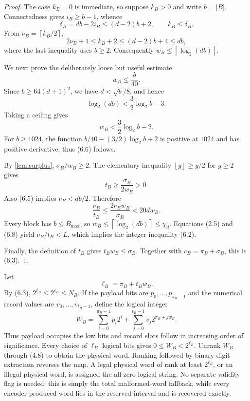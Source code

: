 \documentclass[11pt]{article}
\theoremstyle{definition}
\theoremstyle{remark}
\newcommand{\ceil}[1]{\left\lceil #1\right\rceil}
\newcommand{\floor}[1]{\left\lfloor #1\right\rfloor}
\begin{document}
\begin{proof}
The case $k_B=0$ is immediate, so suppose $k_B>0$ and write $b=|B|$.
Connectedness gives $i_B\ge b-1$, whence
\[
 \delta_B=db-2i_B\le(d-2)b+2,
 \qquad k_B\le\delta_B.                                      \tag{6.4}
\]
From $\nu_B=\ceil{k_B/2}$,
\[
 2\nu_B+1\le k_B+2\le(d-2)b+4\le db,                         \tag{6.5}
\]
where the last inequality uses $b\ge2$.  Consequently
$w_B\le\ceil{\log_2(db)}$.

We next prove the deliberately loose but useful estimate
\[
                              w_B\le\frac b{40}.                \tag{6.6}
\]
Since $b\ge64(d+1)^2$, we have $d<\sqrt b/8$, and hence
\[
 \log_2(db)<\frac32\log_2b-3.
\]
Taking a ceiling gives
\[
 w_B<\frac32\log_2b-2.
\]
For $b\ge1024$, the function
$b/40-(3/2)\log_2b+2$ is positive at $1024$ and has positive derivative;
thus (6.6) follows.

By \cref{lem:surplus}, $\sigma_B/w_B\ge2$.  The elementary inequality
$\floor y\ge y/2$ for $y\ge2$ gives
\[
                         t_B\ge\frac{\sigma_B}{2w_B}>0.        \tag{6.7}
\]
Also (6.5) implies $\nu_B<db/2$.  Therefore
\[
 \frac{\nu_B}{t_B}
 \le\frac{2\nu_Bw_B}{\sigma_B}
 <20d w_B.                                                     \tag{6.8}
\]
Every block has $b\le B_{\max}$, so
$w_B\le\ceil{\log_2(db)}\le\chi_d$.  Equations (2.5) and (6.8) yield
$\nu_B/t_B<L$, which implies the integer inequality (6.2).

Finally, the definition of $t_B$ gives $t_Bw_B\le\sigma_B$.  Together with
$c_B=\pi_B+\sigma_B$, this is (6.3).
\end{proof}

Let
\[
                              \ell_B=\pi_B+t_Bw_B.              \tag{6.9}
\]
By (6.3), $2^{\ell_B}\le2^{c_B}\le N_B$.  If the payload bits are
$p_0,\ldots,p_{\pi_B-1}$ and the numerical record values are
$v_0,\ldots,v_{t_B-1}$, define the logical integer
\[
 W_B=\sum_{i=0}^{\pi_B-1}p_i2^i
       +\sum_{j=0}^{t_B-1}v_j2^{\pi_B+jw_B}.
\]
Thus payload occupies the low bits and record slots follow in increasing
order of significance.  Every choice of $\ell_B$ logical bits gives
$0\le W_B<2^{\ell_B}$.  Unrank $W_B$ through (4.8) to obtain the physical
word.  Ranking followed by binary digit extraction reverses the map.
A legal physical word of rank at least $2^{\ell_B}$, or
an illegal physical word, is assigned the all-zero logical string.  No
separate validity flag is needed: this is simply the total malformed-word
fallback, while every encoder-produced word lies in the reserved interval
and is recovered exactly.
\end{document}
